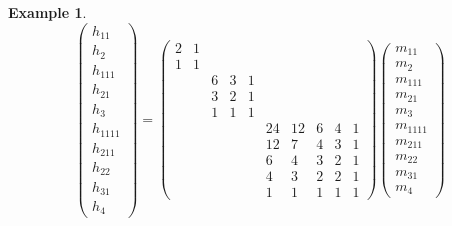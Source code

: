 \documentclass[12pt]{article}
\theoremstyle{plain}
\theoremstyle{definition}
\newtheorem{example}[theorem]{Example}
\theoremstyle{remark}
\numberwithin{equation}{section}
\begin{document}
\begin{example}
\[
\begin{pmatrix} h_{11}\\ h_2\\ h_{111}\\ h_{21}\\ h_3\\
h_{1111}\\ h_{211} \\ h_{22}\\ h_{31}\\ h_4
\end{pmatrix}
=
\begin{pmatrix}
2 & 1 &
 & & &
& & & & \\
1 & 1 &
 & & &
& & & & \\
 & &
6 & 3 & 1 &
& & & & \\
 & &
3 & 2 & 1 &
& & & & \\
 & &
1 & 1 & 1 &
& & & & \\
 & &
 & & &
24 & 12 & 6 & 4 & 1 \\
 & &
 & & &
12 & 7 & 4 & 3 & 1 \\
 & &
 & & &
6 & 4 & 3 & 2 & 1 \\
 & &
 & & &
4 & 3 & 2 & 2 & 1 \\
 & &
 & & &
1 & 1 & 1 & 1 & 1
\end{pmatrix} 
\begin{pmatrix} m_{11}\\ m_2\\ m_{111}\\ m_{21}\\ m_3\\
m_{1111}\\ m_{211} \\ m_{22}\\ m_{31}\\ m_4
\end{pmatrix}
\]
\end{example}
\end{document}
